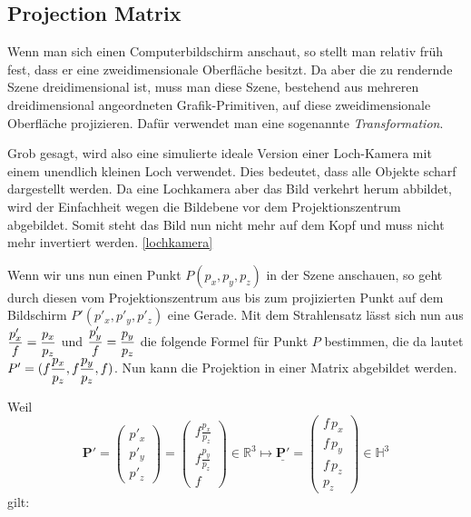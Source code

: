 \subsection{Projection Matrix}
\label{Sec:Projection}
Wenn man sich einen Computerbildschirm anschaut, so stellt man relativ früh fest, dass er eine zweidimensionale Oberfläche besitzt. 
Da aber die zu rendernde Szene dreidimensional ist, muss man diese Szene, bestehend aus mehreren dreidimensional angeordneten Grafik-Primitiven, auf diese zweidimensionale Oberfläche projizieren. Dafür verwendet man eine sogenannte \textit{Transformation}.

Grob gesagt, wird also eine simulierte ideale Version einer Loch-Kamera mit einem unendlich kleinen Loch verwendet. Dies bedeutet, dass alle Objekte scharf dargestellt werden. Da eine Lochkamera aber das Bild verkehrt herum abbildet, wird der Einfachheit wegen die Bildebene vor dem Projektionszentrum abgebildet. Somit steht das Bild nun nicht mehr auf dem Kopf und muss nicht mehr invertiert werden. \cref{lochkamera}

Wenn wir uns nun einen Punkt $P(p_{x}, p_{y}, p_{z})$ in der Szene anschauen, so geht durch diesen vom Projektionszentrum aus bis zum projizierten Punkt auf dem Bildschirm $P'(p'_{x}, p'_{y}, p'_{z})$ eine Gerade. Mit dem Strahlensatz lässt sich nun aus $\dfrac{p'_{x}}{\mathnormal{f}} = \dfrac{p_{x}}{p_{z}} $ und $ \dfrac{p'_{y}}{\mathnormal{f}} = \dfrac{p_{y}}{p_{z}} $ die folgende Formel für Punkt $P$ bestimmen, die da lautet $P'=(\mathnormal{f}\dfrac{p_{x}}{p_{z}}, \mathnormal{f}\dfrac{p_{y}}{p_{z}}, \mathnormal{f})$.
Nun kann die Projektion in einer Matrix abgebildet werden.

Weil $$\mathbf{P'}= \begin{pmatrix} p'_x \\ p'_y \\ p'_z \end{pmatrix}= \begin{pmatrix} f
\frac{p_x}{p_z}\\ f \frac{p_y}{p_z}\\ f \end{pmatrix} \in \mathbb{R}^3 \longmapsto \underline{\mathbf{P'}}= \begin{pmatrix}f \, p_x \\f \, p_y \\ f \, p_z\\
p_z\end{pmatrix} \in \mathbb{H}^3 $$
gilt:	


